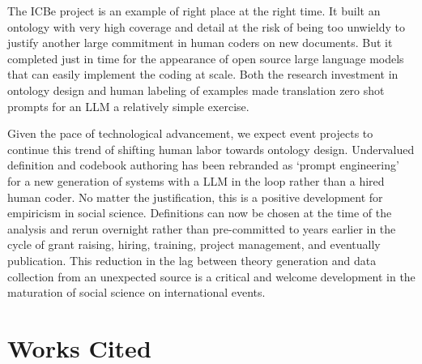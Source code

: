 \documentclass[
]{article}
\begin{document}
The ICBe project is an example of right place at the right time. It
built an ontology with very high coverage and detail at the risk of
being too unwieldy to justify another large commitment in human coders
on new documents. But it completed just in time for the appearance of
open source large language models that can easily implement the coding
at scale. Both the research investment in ontology design and human
labeling of examples made translation zero shot prompts for an LLM a
relatively simple exercise.

Given the pace of technological advancement, we expect event projects to
continue this trend of shifting human labor towards ontology design.
Undervalued definition and codebook authoring has been rebranded as
`prompt engineering' for a new generation of systems with a LLM in the
loop rather than a hired human coder. No matter the justification, this
is a positive development for empiricism in social science. Definitions
can now be chosen at the time of the analysis and rerun overnight rather
than pre-committed to years earlier in the cycle of grant raising,
hiring, training, project management, and eventually publication. This
reduction in the lag between theory generation and data collection from
an unexpected source is a critical and welcome development in the
maturation of social science on international events.

\section*{Works Cited}\label{works-cited}
\end{document}

